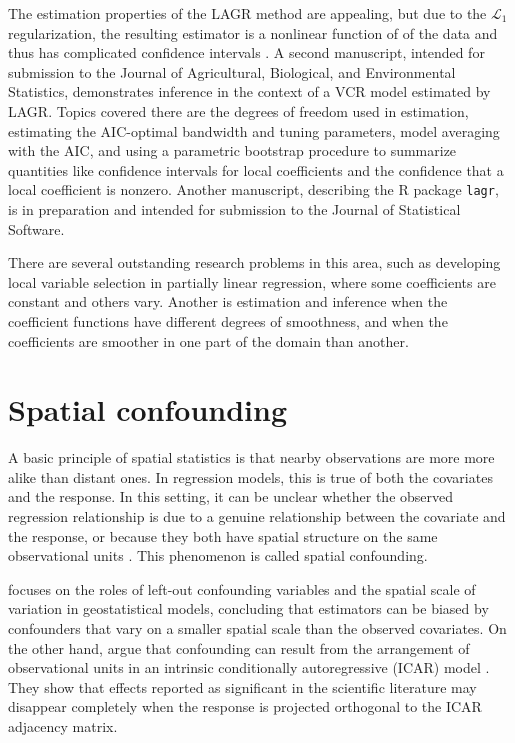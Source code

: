 \documentclass[11pt, oneside]{article}   	%
\begin{document}
The estimation properties of the LAGR method are appealing, but due to
the \(\mathcal{L}_1\) regularization, the resulting estimator is a
nonlinear function of of the data and thus has complicated confidence
intervals \citep{Knight-Fu-2000}. A second manuscript, intended for
submission to the Journal of Agricultural, Biological, and Environmental
Statistics, demonstrates inference in the context of a VCR model
estimated by LAGR. Topics covered there are the degrees of freedom used
in estimation, estimating the AIC-optimal bandwidth and tuning
parameters, model averaging with the AIC, and using a parametric
bootstrap procedure to summarize quantities like confidence intervals
for local coefficients and the confidence that a local coefficient is
nonzero. Another manuscript, describing the R package {\tt lagr}, is in
preparation and intended for submission to the Journal of Statistical
Software.

There are several outstanding research problems in this area, such as
developing local variable selection in partially linear regression,
where some coefficients are constant and others vary. Another is
estimation and inference when the coefficient functions have different
degrees of smoothness, and when the coefficients are smoother in one
part of the domain than another.

\section*{Spatial confounding}\label{spatial-confounding}

A basic principle of spatial statistics is that nearby observations are
more more alike than distant ones. In regression models, this is true of
both the covariates and the response. In this setting, it can be unclear
whether the observed regression relationship is due to a genuine
relationship between the covariate and the response, or because they
both have spatial structure on the same observational units
\citep{Hodges-Reich-2010,Paciorek-2011}. This phenomenon is called
spatial confounding.

\cite{Paciorek-2011} focuses on the roles of left-out confounding variables
and the spatial scale of variation in geostatistical models, concluding
that estimators can be biased by confounders that vary on a smaller
spatial scale than the observed covariates. On the other hand,
\cite{Hodges-Reich-2010} argue that confounding can result from the
arrangement of observational units in an intrinsic conditionally
autoregressive (ICAR) model \citep{Besag-York-Mollie-1991}. They show that
effects reported as significant in the scientific literature may
disappear completely when the response is projected orthogonal to the
ICAR adjacency matrix.
\end{document}
